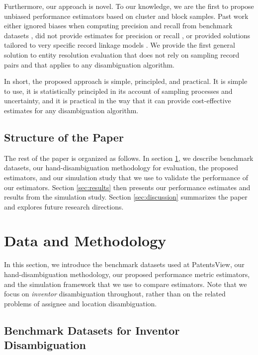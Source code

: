 \documentclass[fontsize=11pt]{article}
\theoremstyle{definition}
\begin{document}
{Furthermore, our approach is novel. To our knowledge, we are the first to propose unbiased performance estimators based on cluster and block samples. Past work either ignored biases when computing precision and recall from benchmark datasets \citep{frisoli2018exploring, Monath2021, han2019disambiguating}, did not provide estimates for precision or recall \citep{mcveigh2019scaling}, or provided solutions tailored to very specific record linkage models \citep{Belin1995}. We provide the first general solution to entity resolution evaluation that does not rely on sampling record pairs and that applies to any disambiguation algorithm.}


In short, the proposed approach is simple, principled, and practical. It is simple to use, it is statistically principled in its account of sampling processes and uncertainty, and it is practical in the way that it can provide cost-effective estimates for any disambiguation algorithm.

\subsection{Structure of the Paper}

The rest of the paper is organized as follows. In section \ref{sec:data_methods}, {we describe benchmark datasets, our hand-disambiguation methodology for evaluation, the proposed estimators, and our simulation study that we use to validate the performance of our estimators.} Section \ref{sec:results} then presents our performance estimates and results from the simulation study. Section \ref{sec:discussion} summarizes the paper and explores future research directions.

\section{Data and Methodology}\label{sec:data_methods}

In this section, {we introduce the benchmark datasets used at PatentsView, our hand-disambiguation methodology, our proposed performance metric estimators, and the simulation framework that we use to compare estimators.} {Note that we focus on \textit{inventor} disambiguation throughout, rather than on the related problems of assignee and location disambiguation.}

\subsection{Benchmark Datasets for Inventor Disambiguation}
\end{document}
